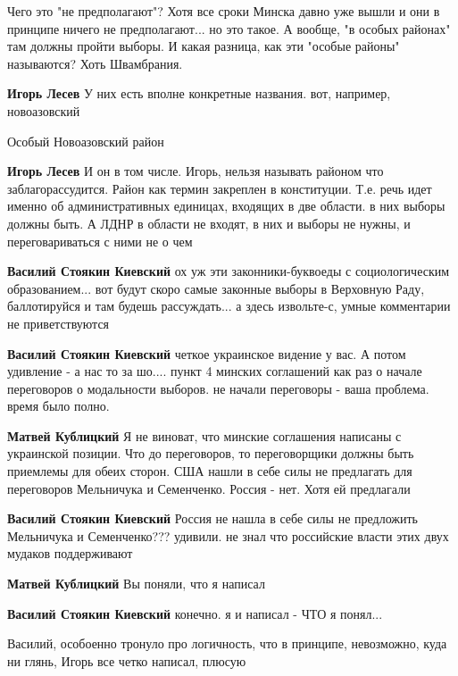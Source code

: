 \begin{itemize}
\begin{itemize}
Чего это "не предполагают"? Хотя все сроки Минска давно уже вышли и они в
принципе ничего не предполагают... но это такое. А вообще, "в особых районах"
там должны пройти выборы. И какая разница, как эти "особые районы" называются?
Хоть Швамбрания.

\textbf{Игорь Лесев} У них есть вполне конкретные названия. вот, например, новоазовский

Особый Новоазовский район

\textbf{Игорь Лесев} И он в том числе. Игорь, нельзя называть районом что заблагорассудится. Район как термин закреплен в конституции. Т.е. речь идет именно об административных единицах, входящих в две области. в них выборы должны быть. А ЛДНР в области не входят, в них и выборы не нужны, и переговариваться с ними не о чем

\textbf{Василий Стоякин Киевский} ох уж эти законники-буквоеды с социологическим образованием... вот будут скоро самые законные выборы в Верховную Раду, баллотируйся и там будешь рассуждать... а здесь извольте-с, умные комментарии не приветствуются

\textbf{Василий Стоякин Киевский} четкое украинское видение у вас. А потом удивление - а нас то за шо.... пункт 4 минских соглашений как раз о начале переговоров о модальности выборов. не начали переговоры - ваша проблема. время было полно.

\textbf{Матвей Кублицкий} Я не виноват, что минские соглашения написаны с украинской позиции. Что до переговоров, то переговорщики должны быть приемлемы для обеих сторон. США нашли в себе силы не предлагать для переговоров Мельничука и Семенченко. Россия - нет. Хотя ей предлагали

\textbf{Василий Стоякин Киевский} Россия не нашла в себе силы не предложить Мельничука и Семенченко??? удивили. не знал что российские власти этих двух мудаков поддерживают

\textbf{Матвей Кублицкий} Вы поняли, что я написал

\textbf{Василий Стоякин Киевский} конечно. я и написал - ЧТО я понял...

Василий, особоенно тронуло про логичность, что в принципе, невозможно, куда ни глянь, Игорь все четко написал, плюсую
\end{itemize} %


\end{itemize}
